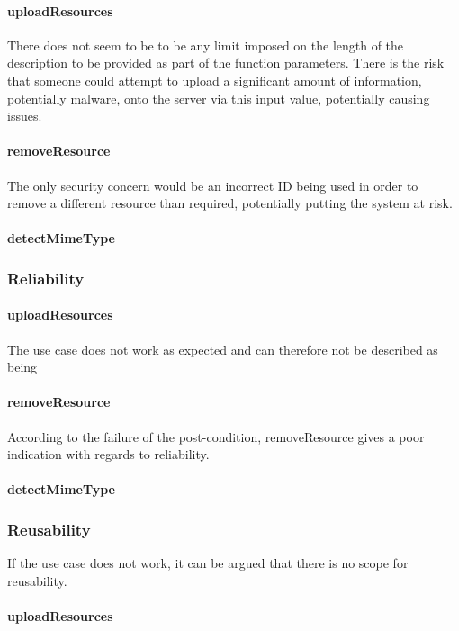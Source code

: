 \documentclass[a4paper]{article}
\begin{document}
\paragraph{uploadResources}
There does not seem to be to be any limit imposed on the length of the description to be provided as part of the function parameters. There is the risk that someone could attempt to upload a significant amount of information, potentially malware, onto the server via this input value, potentially causing issues. 

\paragraph{removeResource}
The only security concern would be an incorrect ID being used in order to remove a different resource than required, potentially putting the system at risk.

\paragraph{detectMimeType}

\subsubsection {Reliability}

\paragraph{uploadResources}
The use case does not work as expected and can therefore not be described as being 

\paragraph{removeResource}
According to the failure of the post-condition, removeResource gives a poor indication with regards to reliability.

\paragraph{detectMimeType}

\subsubsection {Reusability}
If the use case does not work, it can be argued that there is no scope for reusability.

\paragraph{uploadResources}
\end{document}
